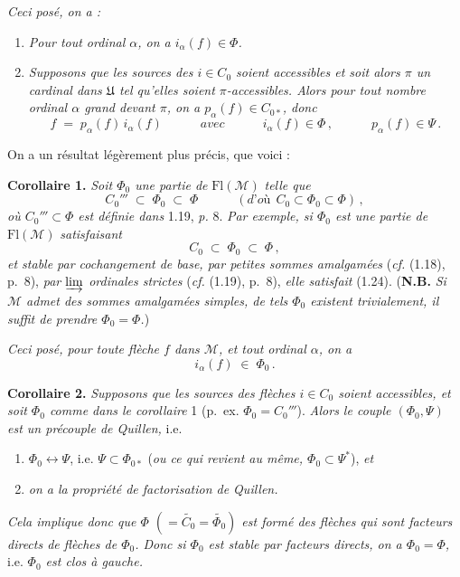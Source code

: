 \documentclass[11pt]{article}
\newcommand{\msp}[1]{\marginpar{\footnotesize [#1]}}
\newcommand{\Fl}{\mathrm{Fl}}
\newcommand{\cM}{\mathcal{M}}
\begin{document}
\msp{page 11}

{\itshape Ceci posé, on a :}
\begin{enumerate}[label={}, leftmargin=*]
\item[a)] {\itshape Pour tout ordinal $\alpha$, on a $i_\alpha(f)\in\Phi$.}
\item[b)] {\itshape Supposons que les sources des $i\in C_0$ soient accessibles et soit alors $\pi$ un cardinal dans $\mathfrak{U}$ tel qu'elles soient $\pi$-accessibles. Alors pour tout nombre ordinal $\alpha$ grand devant $\pi$, on a $p_\alpha(f)\in C_{0*}$, donc}
\[
f \;=\; p_\alpha(f)\, i_\alpha(f) \qquad\quad \textit{avec} \qquad\quad i_\alpha(f)\in\Phi\,, \qquad\quad p_\alpha(f)\in\Psi\,.
\]
\end{enumerate}

On a un résultat légèrement plus précis, que voici :

\textbf{Corollaire 1.} \textit{Soit $\Phi_0$ une partie de} $\Fl(\cM)$ \textit{telle que}
\[
C_0''' \;\subset\; \Phi_0 \;\subset\; \Phi \qquad\quad (\textit{d'où}\ \ C_0\subset\Phi_0\subset\Phi)\,,
\tag*{(1.24)}
\]
\textit{où $C_0'''\subset\Phi$ est définie dans} 1.19, \textit{p.} 8. \textit{Par exemple, si $\Phi_0$ est une partie de} $\Fl(\cM)$ \textit{satisfaisant}
\[
C_0 \;\subset\; \Phi_0 \;\subset\; \Phi\,,
\]
\textit{et stable par cochangement de base, par petites sommes amalgamées} (\textit{cf.} (1.18), p.~8), \textit{par $\varinjlim$ ordinales strictes} (\textit{cf.} (1.19), p.~8), \textit{elle satisfait} (1.24). (\textbf{N.B.} \textit{Si $\cM$ admet des sommes amalgamées simples, de tels $\Phi_0$ existent trivialement, il suffit de prendre $\Phi_0=\Phi$.})

\msp{page 12}

\textit{Ceci posé, pour toute flèche $f$ dans $\cM$, et tout ordinal $\alpha$, on a}
\[
i_\alpha(f) \;\in\; \Phi_0\,.
\]

\textbf{Corollaire 2.} \textit{Supposons que les sources des flèches $i\in C_0$ soient accessibles, et soit $\Phi_0$ comme dans le corollaire} 1 (p.~ex. $\Phi_0=C_0'''$). \textit{Alors le couple $(\Phi_0,\Psi)$ est un précouple de Quillen,} i.e.
\begin{enumerate}[label={}, leftmargin=*]
\item[a)] $\Phi_0\longleftrightarrow\Psi$, i.e. $\Psi\subset\Phi_{0*}$ (\textit{ou ce qui revient au même, $\Phi_0\subset\Psi^*$}), \textit{et}
\item[b)] \textit{on a la propriété de factorisation de Quillen.}
\end{enumerate}
\textit{Cela implique donc que $\Phi$ $(=\widetilde{C_0}=\widetilde{\Phi_0})$ est formé des flèches qui sont facteurs directs de flèches de $\Phi_0$. Donc si $\Phi_0$ est stable par facteurs directs, on a $\Phi_0=\Phi$,} i.e. \textit{$\Phi_0$ est clos à gauche.}
\end{document}
